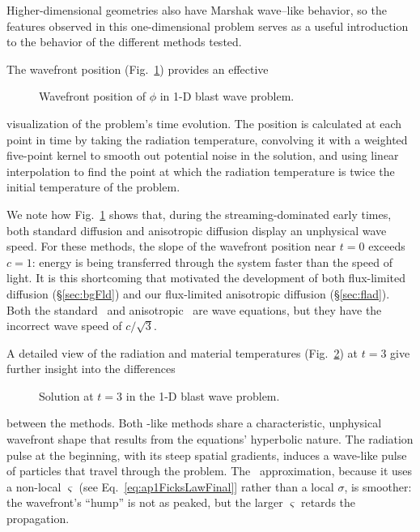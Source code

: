 Higher-dimensional geometries also have Marshak wave--like behavior, so the
features observed in this one-dimensional problem serves as a useful
introduction to the behavior of the different methods tested.

The wavefront position (Fig.~\ref{fig:1dblastWavefront}) provides an effective
%
\begin{figure}[htb]
  \centering\small
  
  \caption{Wavefront position of $\phi$ in 1-D blast wave problem.}
  \label{fig:1dblastWavefront}
\end{figure}
%
visualization of the problem's time evolution. The position is calculated at
each point in time by taking the radiation temperature, convolving it with a
weighted five-point kernel to smooth out potential noise in the solution, and
using linear interpolation to find the point at which the radiation temperature
is twice the initial temperature of the problem.

We note how Fig.~\ref{fig:1dblastWavefront}
shows that, during the streaming-dominated early times, both standard diffusion
and anisotropic diffusion display an unphysical wave speed. For these methods,
the slope of the wavefront position near $t=0$ exceeds $c=1$: energy is being
transferred through the system faster than the speed of light. It is this
shortcoming that motivated the development of both flux-limited diffusion
(\S\ref{sec:bgFld}) and our flux-limited anisotropic diffusion
(\S\ref{sec:flad}). Both the standard \Pone\ and anisotropic \Pone\ are wave
equations, but they have the incorrect wave speed of $c/\sqrt{3}$.

A detailed view of the radiation and material temperatures
(Fig.~\ref{fig:1dblastTemp}) at $t=3$ give further insight into the differences
%
\begin{figure}[htb]
  \centering\small
  \centering
  \caption{Solution at $t=3$ in the 1-D blast wave problem.}
  \label{fig:1dblastTemp}
\end{figure}
%
between the methods.
Both \Pone-like methods share a characteristic, unphysical wavefront shape
that results from the equations' hyperbolic nature.
The radiation pulse at the beginning, with its steep spatial gradients,
induces a wave-like pulse of particles that travel through the problem. The
\APone\ approximation, because it uses a non-local $\varsigma$ (see
Eq.~\eqref{eq:ap1FicksLawFinal}] rather than a local $\sigma$, is smoother: the
wavefront's ``hump''
is not as peaked, but the larger $\varsigma$ retards the propagation.

